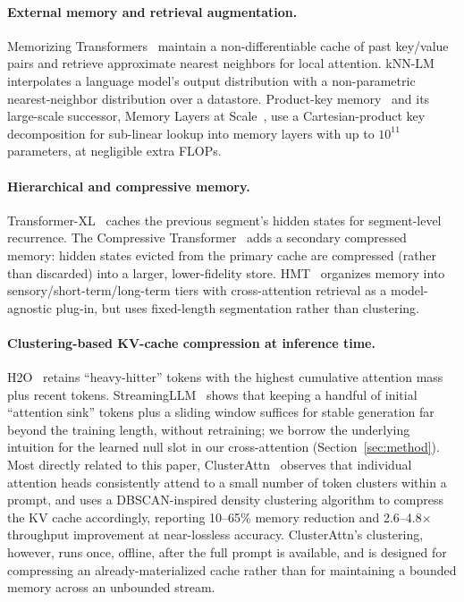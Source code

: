 \documentclass[11pt]{article}
\begin{document}
\paragraph{External memory and retrieval augmentation.}
Memorizing Transformers~\citep{wu2022memorizing} maintain a non-differentiable cache of past
key/value pairs and retrieve approximate nearest neighbors for local attention. kNN-LM
~\citep{khandelwal2020knnlm} interpolates a language model's output distribution with a
non-parametric nearest-neighbor distribution over a datastore. Product-key
memory~\citep{lample2019memory} and its large-scale successor, Memory Layers at
Scale~\citep{meta2024memorylayers}, use a Cartesian-product key decomposition for sub-linear
lookup into memory layers with up to $10^{11}$ parameters, at negligible extra FLOPs.

\paragraph{Hierarchical and compressive memory.}
Transformer-XL~\citep{dai2019transformerxl} caches the previous segment's hidden states for
segment-level recurrence. The Compressive Transformer~\citep{rae2020compressive} adds a
secondary compressed memory: hidden states evicted from the primary cache are compressed
(rather than discarded) into a larger, lower-fidelity store. HMT~\citep{he2025hmt} organizes
memory into sensory/short-term/long-term tiers with cross-attention retrieval as a
model-agnostic plug-in, but uses fixed-length segmentation rather than clustering.

\paragraph{Clustering-based KV-cache compression at inference time.}
H2O~\citep{zhang2023h2o} retains ``heavy-hitter'' tokens with the highest cumulative attention
mass plus recent tokens. StreamingLLM~\citep{xiao2024streaming} shows that keeping a handful of
initial ``attention sink'' tokens plus a sliding window suffices for stable generation far
beyond the training length, without retraining; we borrow the underlying intuition for the
learned null slot in our cross-attention (Section~\ref{sec:method}). Most directly related to
this paper, ClusterAttn~\citep{clusterattn2025} observes that individual attention heads
consistently attend to a small number of token clusters within a prompt, and uses a
DBSCAN-inspired density clustering algorithm to compress the KV cache accordingly, reporting
10--65\% memory reduction and 2.6--4.8$\times$ throughput improvement at near-lossless accuracy.
ClusterAttn's clustering, however, runs once, offline, after the full prompt is available, and
is designed for compressing an already-materialized cache rather than for maintaining a bounded
memory across an unbounded stream.
\end{document}
